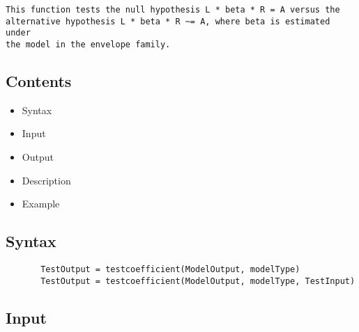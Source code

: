 \documentclass[a4paper,11pt,openany]{memoir}
\begin{document}
\begin{verbatim}This function tests the null hypothesis L * beta * R = A versus the
alternative hypothesis L * beta * R ~= A, where beta is estimated under
the model in the envelope family.\end{verbatim}
    
\subsection*{Contents}

\begin{itemize}
\setlength{\itemsep}{-1ex}
   \item Syntax
   \item Input
   \item Output
   \item Description
   \item Example
\end{itemize}


\subsection*{Syntax}


\begin{verbatim}       TestOutput = testcoefficient(ModelOutput, modelType)
       TestOutput = testcoefficient(ModelOutput, modelType, TestInput)\end{verbatim}
    

\subsection*{Input}
\end{document}
